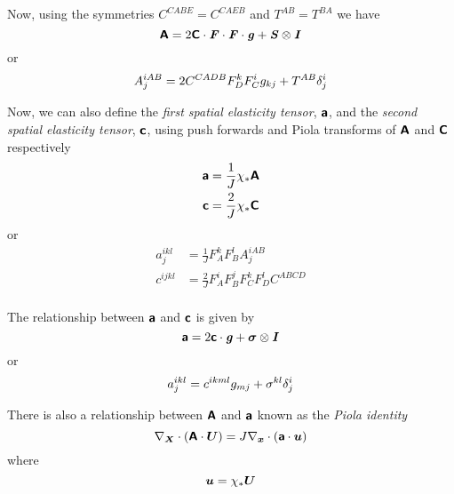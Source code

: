 Now, using the symmetries $C^{CABE}=C^{CAEB}$ and $T^{AB}=T^{BA}$ we have
\begin{equation}
  \boldsymbol{\mathsf{A}}=2\boldsymbol{\mathsf{C}}\cdot\boldsymbol{\mathit{F}}\cdot\boldsymbol{\mathit{F}}\cdot\boldsymbol{\mathit{g}}+
   \boldsymbol{\mathit{S}} \otimes \boldsymbol{\mathit{I}} 
\end{equation}
or
\begin{equation}
  A^{iAB}_{j}=2C^{CADB}F^{k}_{D}F^{i}_{C}g_{kj}+T^{AB} \delta_{j}^{i} 
\end{equation}

Now, we can also define the \emph{first spatial elasticity tensor},
$\boldsymbol{\mathsf{a}}$, and the \emph{second spatial elasticity tensor},
$\boldsymbol{\mathsf{c}}$, using push forwards and Piola transforms of $\boldsymbol{\mathsf{A}}$
and $\boldsymbol{\mathsf{C}}$ respectively \ie{}
\begin{equation}
  \begin{split}
    \boldsymbol{\mathsf{a}}&=\frac{1}{J} \chi_{*}\boldsymbol{\mathsf{A}} \\
    \boldsymbol{\mathsf{c}}&=\frac{2}{J} \chi_{*}\boldsymbol{\mathsf{C}} \\
  \end{split}
\end{equation}
or
\begin{equation}
  \begin{split}
    a^{ikl}_{j}&=\frac{1}{J}F^{k}_{A}F^{l}_{B}A^{iAB}_{j} \\
    c^{ijkl}&=\frac{2}{J}F^{i}_{A}F^{j}_{B}F^{k}_{C}F^{l}_{D}C^{ABCD} \\
  \end{split}
\end{equation}

The relationship between $\boldsymbol{\mathsf{a}}$ and $\boldsymbol{\mathsf{c}}$ is given by
\begin{equation}
  \boldsymbol{\mathsf{a}}=2\boldsymbol{\mathsf{c}}\cdot\boldsymbol{\mathit{g}}+ \boldsymbol{\mathit{\sigma}} \otimes \boldsymbol{\mathit{I}} 
\end{equation}
or
\begin{equation}
  a^{ikl}_{j}=c^{ikml}g_{mj}+\sigma^{kl} \delta_{j}^{i} 
\end{equation}

There is also a relationship between $\boldsymbol{\mathsf{A}}$ and $\boldsymbol{\mathsf{a}}$
known as the \emph{Piola identity} \ie
\begin{equation}
  \divergence{\vectr{X}}{\pbrac{\dotprod{\tensorfour{A}}{\vectr{U}}}}=
  J\divergence{\vectr{x}}{\pbrac{\dotprod{\tensorfour{a}}{\vectr{u}}}}
\end{equation}
where
\begin{equation}
  \boldsymbol{u}= \chi_{*}\boldsymbol{U} 
\end{equation}

